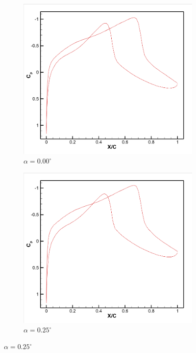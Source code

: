 \begin{figure}[H]
\begin{subfigure}[b]{0.18\textwidth}
\centering
\includegraphics[width=\linewidth]{6.png}
\caption{$\alpha=0.00^\circ$}
\end{subfigure}
\hfill
\begin{subfigure}[b]{0.18\textwidth}
\centering
\includegraphics[width=\linewidth]{7.png}
\caption{$\alpha=0.25^\circ$}
\end{subfigure}

\end{figure}
